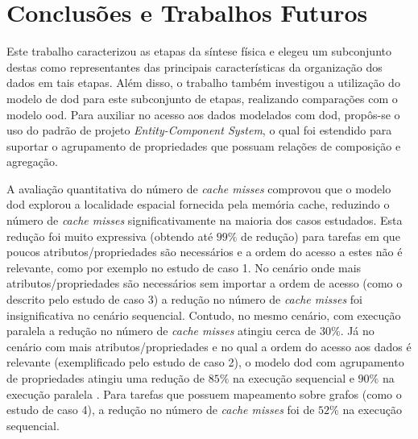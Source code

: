 
\chapter{Conclusões e Trabalhos Futuros}
\label{cap:conclusao_e_trabalhos_futuros}

    


Este trabalho caracterizou as etapas da síntese física e elegeu um subconjunto destas como representantes das principais características da organização dos dados em tais etapas.
Além disso, o trabalho também investigou a utilização do modelo de \ac{dod} para este subconjunto de etapas, realizando comparações com o modelo \ac{ood}.
Para auxiliar no acesso aos dados modelados com \ac{dod}, propôs-se o uso do padrão de projeto \textit{Entity-Component System}, o qual foi estendido para suportar o agrupamento de propriedades que possuam relações de composição e agregação.

A avaliação quantitativa do número de \textit{cache misses} comprovou que o modelo \ac{dod} explorou a localidade espacial fornecida pela memória cache, reduzindo o número de \textit{cache misses} significativamente na maioria dos casos estudados.
Esta redução foi muito expressiva (obtendo até $99\%$ de redução) para tarefas em que poucos atributos/propriedades são necessários e a ordem do acesso a estes não é relevante, como por exemplo no estudo de caso 1.
No cenário onde mais atributos/propriedades são necessários sem importar a ordem de acesso (como o descrito pelo estudo de caso 3) a redução no número de  \textit{cache misses} foi insignificativa no cenário sequencial.
Contudo, no mesmo cenário, com execução paralela a redução no número de \textit{cache misses} atingiu cerca de $30\%$.
Já no cenário com mais atributos/propriedades e no qual a ordem do acesso aos dados é relevante (exemplificado pelo estudo de caso 2), o modelo \ac{dod} com agrupamento de propriedades atingiu uma redução de $85\%$ na execução sequencial e $90\%$ na execução paralela .
Para tarefas que possuem mapeamento sobre grafos (como o estudo de caso 4), a redução no número de  \textit{cache misses} foi de $52\%$ na execução sequencial.

